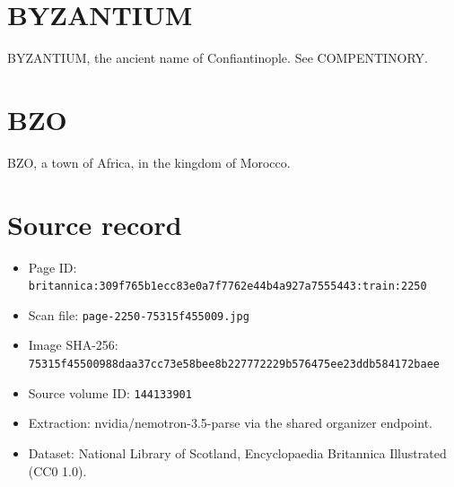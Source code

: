 \documentclass{article}
\begin{document}
\section*{BYZANTIUM}
BYZANTIUM, the ancient name of Confiantinople. See COMPENTINORY.

\section*{BZO}
BZO, a town of Africa, in the kingdom of Morocco.

\section*{Source record}
\begin{itemize}
\item Page ID: \texttt{britannica:309f765b1ecc83e0a7f7762e44b4a927a7555443:train:2250}
\item Scan file: \texttt{page-2250-75315f455009.jpg}
\item Image SHA-256: \texttt{75315f45500988daa37cc73e58bee8b227772229b576475ee23ddb584172baee}
\item Source volume ID: \texttt{144133901}
\item Extraction: nvidia/nemotron-3.5-parse via the shared organizer endpoint.
\item Dataset: National Library of Scotland, Encyclopaedia Britannica Illustrated (CC0 1.0).
\end{itemize}
\end{document}
